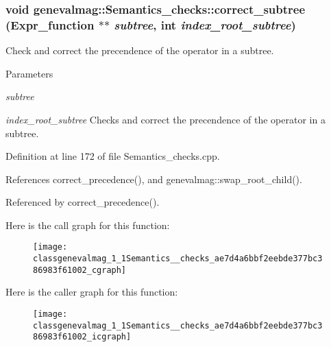 \hypertarget{classgenevalmag_1_1Semantics__checks_ae7d4a6bbf2eebde377bc386983f61002}{
\subsubsection[{correct\_\-subtree}]{\setlength{\rightskip}{0pt plus 5cm}void genevalmag::Semantics\_\-checks::correct\_\-subtree ({\bf Expr\_\-function} $\ast$$\ast$ {\em subtree}, \/  int {\em index\_\-root\_\-subtree})}}
\label{classgenevalmag_1_1Semantics__checks_ae7d4a6bbf2eebde377bc386983f61002}
Check and correct the precendence of the operator in a subtree. 
\begin{DoxyParams}{Parameters}
\item[{\em subtree}]\item[{\em index\_\-root\_\-subtree}]Checks and correct the precendence of the operator in a subtree. \end{DoxyParams}


Definition at line 172 of file Semantics\_\-checks.cpp.



References correct\_\-precedence(), and genevalmag::swap\_\-root\_\-child().



Referenced by correct\_\-precedence().



Here is the call graph for this function:\nopagebreak
\begin{figure}[H]
\begin{center}
\leavevmode
\texttt{[image: classgenevalmag\_1\_1Semantics\_\_checks\_ae7d4a6bbf2eebde377bc386983f61002\_cgraph]}
\end{center}
\end{figure}




Here is the caller graph for this function:\nopagebreak
\begin{figure}[H]
\begin{center}
\leavevmode
\texttt{[image: classgenevalmag\_1\_1Semantics\_\_checks\_ae7d4a6bbf2eebde377bc386983f61002\_icgraph]}
\end{center}
\end{figure}


